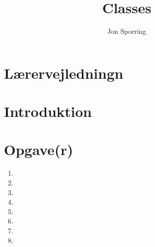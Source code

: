 \documentclass[a4paper,12pt]{article}
\title{Classes}
\author{Jon Sporring}
\begin{document}
\maketitle

\section{Lærervejledningn}

\section{Introduktion}

\section{Opgave(r)}
\begin{enumerate}
\item 
\item 
\item 
\item 
\item 
\item 
\item 
\item 
\end{enumerate}
\end{document}
